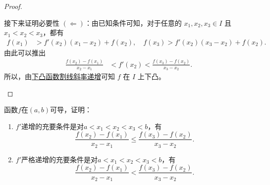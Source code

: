 \documentclass[../../main.tex]{subfiles}
\begin{document}
\begin{proof}
\begin{enumerate}
\begin{enumerate}[(1)]
接下来证明必要性 $(\Leftarrow)$：由已知条件可知，对于任意的 $x_1,x_2,x_3\in I$ 且 $x_1 < x_2 < x_3$，都有
\begin{align*}
f(x_1) &> f'(x_2)(x_1 - x_2) + f(x_2),\quad f(x_3) > f'(x_2)(x_3 - x_2) + f(x_2).
\end{align*}
由此可以推出
\begin{align*}
\frac{f(x_2) - f(x_1)}{x_2 - x_1} &< f'(x_2) < \frac{f(x_3) - f(x_2)}{x_3 - x_2}.
\end{align*}
所以，由\hyperref[下凸函数割线斜率递增]{下凸函数割线斜率递增}可知 $f$ 在 $I$ 上下凸。
\end{enumerate}
\end{enumerate}
\end{proof}

\begin{example}[$\,\,$导数递增则割线斜率也递增]\label{example:导数递增则割线斜率也递增}
函数\(f\)在\((a,b)\)可导，证明：
\begin{enumerate}
\item \(f'\)递增的充要条件是对\(a < x_1 < x_2 < x_3 < b\)，有
\[
\frac{f(x_2)-f(x_1)}{x_2 - x_1}\leqslant\frac{f(x_3)-f(x_2)}{x_3 - x_2}.
\]

\item \(f'\)严格递增的充要条件是对\(a < x_1 < x_2 < x_3 < b\)，有
\[
\frac{f(x_2)-f(x_1)}{x_2 - x_1}<\frac{f(x_3)-f(x_2)}{x_3 - x_2}.
\]
\end{enumerate}
\end{example}
\end{document}
